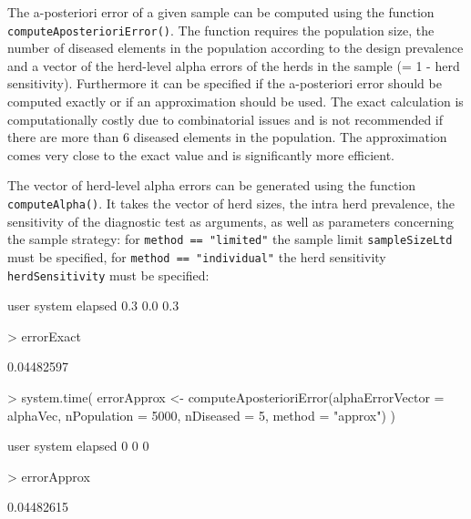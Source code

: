 \documentclass[nojss]{jss}
\begin{document}
The a-posteriori error  of a given sample can be computed using the function  \texttt{computeAposterioriError()}. The function requires the population size, the number of diseased elements in the population according to the design prevalence and a vector of the herd-level alpha errors of the herds in the sample (= 1 - herd sensitivity). Furthermore it can be specified if the a-posteriori error should be computed exactly or if an approximation should be used. The exact calculation is computationally costly due to combinatorial issues and is not recommended if there are more than 6 diseased elements in the population. The approximation comes very close to the exact value and is significantly more efficient.

The vector of herd-level alpha errors can be generated using the function \texttt{computeAlpha()}.  It takes the vector of herd sizes, the intra herd prevalence, the sensitivity of the diagnostic test as arguments, as well as parameters concerning the sample strategy: for \texttt{method == "limited"} the sample limit \texttt{sampleSizeLtd} must be specified, for \texttt{method == "individual"} the herd sensitivity \texttt{herdSensitivity} must be specified:

\begin{Schunk}
\begin{Soutput}
   user  system elapsed 
    0.3     0.0     0.3 
\end{Soutput}
\begin{Sinput}
> errorExact
\end{Sinput}
\begin{Soutput}
[1] 0.04482597
\end{Soutput}
\begin{Sinput}
> system.time({
   errorApprox <- computeAposterioriError(alphaErrorVector = alphaVec,
       nPopulation = 5000, nDiseased = 5, method = "approx")
   })
\end{Sinput}
\begin{Soutput}
   user  system elapsed 
      0       0       0 
\end{Soutput}
\begin{Sinput}
> errorApprox
\end{Sinput}
\begin{Soutput}
[1] 0.04482615
\end{Soutput}
\end{Schunk}



\printindex


\end{document}
